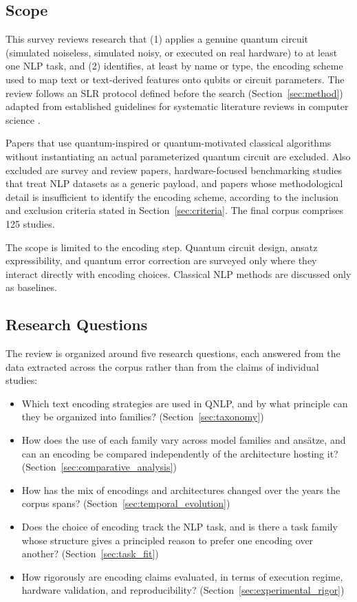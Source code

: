 \documentclass{ieeeaccess}
\begin{document}
\subsection{Scope}
This survey reviews research that (1) applies a genuine quantum circuit (simulated noiseless, simulated noisy, or executed on real hardware) to at least one NLP task, and (2) identifies, at least by name or type, the encoding scheme used to map text or text-derived features onto qubits or circuit parameters. The review follows an SLR protocol defined before the search (Section~\ref{sec:method}) adapted from established guidelines for systematic literature reviews in computer science \cite{keele2007guidelines}.

Papers that use quantum-inspired or quantum-motivated classical algorithms without instantiating an actual parameterized quantum circuit are excluded. Also excluded are survey and review papers, hardware-focused benchmarking studies that treat NLP datasets as a generic payload, and papers whose methodological detail is insufficient to identify the encoding scheme, according to the inclusion and exclusion criteria stated in Section~\ref{sec:criteria}. The final corpus comprises 125 studies.

The scope is limited to the encoding step. Quantum circuit design, ansatz expressibility, and quantum error correction are surveyed only where they interact directly with encoding choices. Classical NLP methods are discussed only as baselines.

\subsection{Research Questions}
\label{subsec:research_questions}

The review is organized around five research questions, each answered from the data extracted across the corpus rather than from the claims of individual studies:

\begin{itemize}
\item[RQ1)] Which text encoding strategies are used in QNLP, and by what principle can they be organized into families? (Section~\ref{sec:taxonomy})

\item[RQ2)] How does the use of each family vary across model families and ans\"atze, and can an encoding be compared independently of the architecture hosting it? (Section~\ref{sec:comparative_analysis})

\item[RQ3)] How has the mix of encodings and architectures changed over the years the corpus spans? (Section~\ref{sec:temporal_evolution})

\item[RQ4)] Does the choice of encoding track the NLP task, and is there a task family whose structure gives a principled reason to prefer one encoding over another? (Section~\ref{sec:task_fit})

\item[RQ5)] How rigorously are encoding claims evaluated, in terms of execution regime, hardware validation, and reproducibility? (Section~\ref{sec:experimental_rigor})
\end{itemize}
\end{document}
